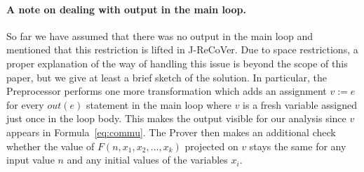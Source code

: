 \documentclass{llncs}
\newcommand{\rloop}{
	\ifmmode
	\mathbf{Loop}
	\else
	\textbf{Loop}
	\fi}
\begin{document}
% 
% 


\paragraph{A note on dealing with output in the main loop.} 

So far we have assumed that there was no output in the main loop and mentioned
that this restriction is lifted in J-ReCoVer. Due to space restrictions, a
proper explanation of the way of handling this issue is beyond the scope of this
paper, but we give at least a brief sketch of the solution. In particular, the
Preprocessor performs one more transformation which adds an assignment $v := e$
for every $out(e)$ statement in the main loop where $v$ is a fresh variable
assigned just once in the loop body. This makes the output visible for our
analysis since $v$ appears in Formula~\ref{eq:commu}. The Prover then makes an
additional check whether the value of $F(n, x_1,x_2,\ldots,x_k)$ projected on
$v$ stays the same for any input value $n$ and any initial values of the
variables $x_i$.
\end{document}
